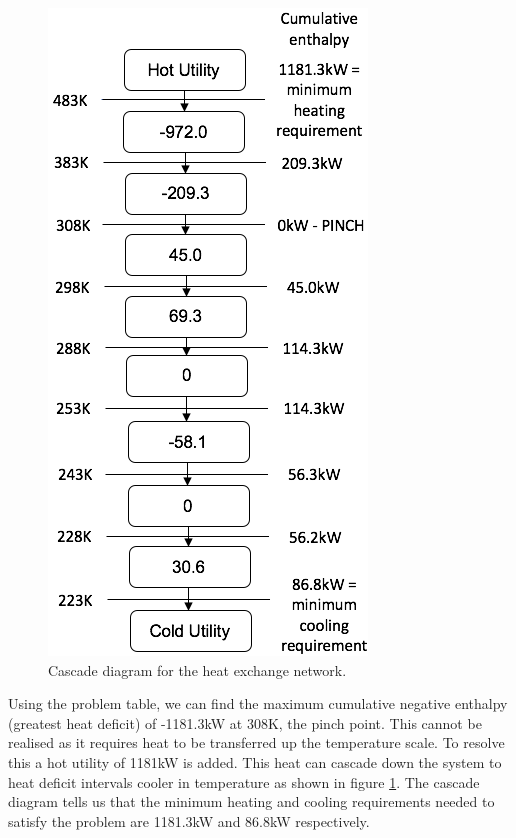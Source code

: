 \documentclass[11pt, oneside]{article}
\begin{document}
\begin{figure}
\includegraphics[width=0.9\linewidth]{./pictures/cascadediagram2} 
\caption{Cascade diagram for the heat exchange network.}
\label{fig:cascade}
\end{figure}
Using the problem table, we can find the maximum cumulative negative enthalpy (greatest heat deficit) of -1181.3kW at 308K, the pinch point. This cannot be realised as it requires heat to be transferred up the temperature scale. To resolve this a hot utility of 1181kW is added. This heat can cascade down the system to heat deficit intervals cooler in temperature as shown in figure \ref{fig:cascade}. The cascade diagram tells us that the minimum heating and cooling requirements needed to satisfy the problem are 1181.3kW and 86.8kW respectively.
\end{document}
